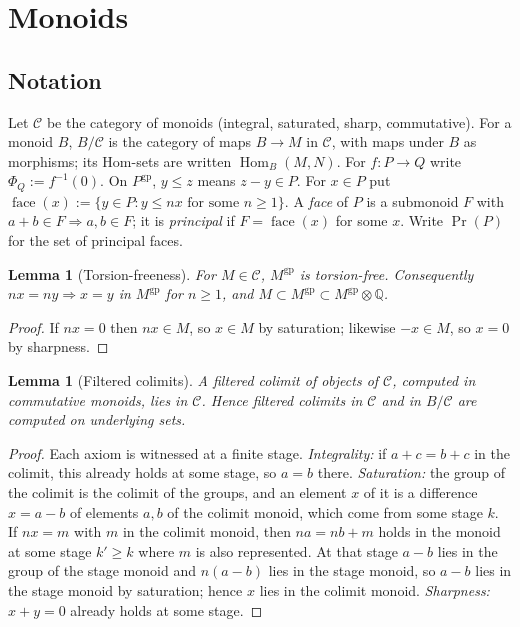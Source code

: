 \documentclass[11pt]{article}
\newtheorem{lemma}[theorem]{Lemma}
\theoremstyle{definition}
\theoremstyle{remark}
\newcommand{\QQ}{\mathbb{Q}}
\newcommand{\cC}{\mathcal{C}}
\newcommand{\gp}{\mathrm{gp}}
\newcommand{\face}{\operatorname{face}}
\newcommand{\Prin}{\operatorname{Pr}}
\newcommand{\Hom}{\operatorname{Hom}}
\begin{document}
\section{Monoids}\label{sec:monoids}

\subsection{Notation}
Let $\cC$ be the category of monoids (integral, saturated, sharp, commutative). For a monoid $B$, $B/\cC$ is the category of maps $B\to M$ in $\cC$, with maps under $B$ as morphisms; its Hom-sets are written $\Hom_B(M,N)$. For $f\colon P\to Q$ write $\Phi_Q:=f^{-1}(0)$. On $P^{\gp}$, $y\le z$ means $z-y\in P$. For $x\in P$ put $\face(x):=\{y\in P: y\le nx\text{ for some }n\ge1\}$. A \emph{face} of $P$ is a submonoid $F$ with $a+b\in F\Rightarrow a,b\in F$; it is \emph{principal} if $F=\face(x)$ for some $x$. Write $\Prin(P)$ for the set of principal faces.

\begin{lemma}[Torsion-freeness]\label{lem:tf}
For $M\in\cC$, $M^{\gp}$ is torsion-free. Consequently $nx=ny\Rightarrow x=y$ in $M^{\gp}$ for $n\ge1$, and $M\subset M^{\gp}\subset M^{\gp}\otimes\QQ$.
\end{lemma}
\begin{proof}
If $nx=0$ then $nx\in M$, so $x\in M$ by saturation; likewise $-x\in M$, so $x=0$ by sharpness.
\end{proof}

\begin{lemma}[Filtered colimits]\label{lem:filt}
A filtered colimit of objects of $\cC$, computed in commutative monoids, lies in $\cC$. Hence filtered colimits in $\cC$ and in $B/\cC$ are computed on underlying sets.
\end{lemma}
\begin{proof}
Each axiom is witnessed at a finite stage. \emph{Integrality:} if $a+c=b+c$ in the colimit, this already holds at some stage, so $a=b$ there. \emph{Saturation:} the group of the colimit is the colimit of the groups, and an element $x$ of it is a difference $x=a-b$ of elements $a,b$ of the colimit monoid, which come from some stage $k$. If $nx=m$ with $m$ in the colimit monoid, then $na=nb+m$ holds in the monoid at some stage $k'\ge k$ where $m$ is also represented. At that stage $a-b$ lies in the group of the stage monoid and $n(a-b)$ lies in the stage monoid, so $a-b$ lies in the stage monoid by saturation; hence $x$ lies in the colimit monoid. \emph{Sharpness:} $x+y=0$ already holds at some stage.
\end{proof}
\end{document}
